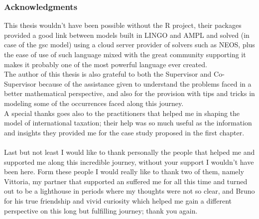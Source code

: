 \begin{doublespace}
\subsubsection{Acknowledgments}
This thesis wouldn't have been possible without the R project, their packages provided a good link between models built in LINGO and AMPL\cite{Fourer1997} and solved (in case of the \gls{gsc} model) using a cloud server provider of solvers such as NEOS, plus the ease of use of such language mixed with the great community supporting it makes it probably one of the most powerful language ever created. 
\\
The author of this thesis is also grateful to both the Supervisor and Co-Supervisor because of the assistance given to understand the problems faced in a better mathematical perspective, and also for the provision with tips and tricks in modeling some of the occurrences faced along this journey.
\\
A special thanks goes also to the practitioners that helped me in shaping the model of international taxation; their help was so much useful as the information and insights they provided me for the case study proposed in the first chapter.
\\
\\
Last but not least I would like to thank personally the people that helped me and supported me along this incredible journey, without your support I wouldn't have been here. Form these people I would really like to thank two of them, namely Vittoria, my partner that supported an suffered me for all this time and turned out to be a lighthouse in periods where my thoughts were not so clear, and Bruno for his true friendship and vivid curiosity which helped me gain a different perspective on this long but fulfilling journey; thank you again.

\end{doublespace}

\clearpage{\pagestyle{empty}\cleardoublepage}
